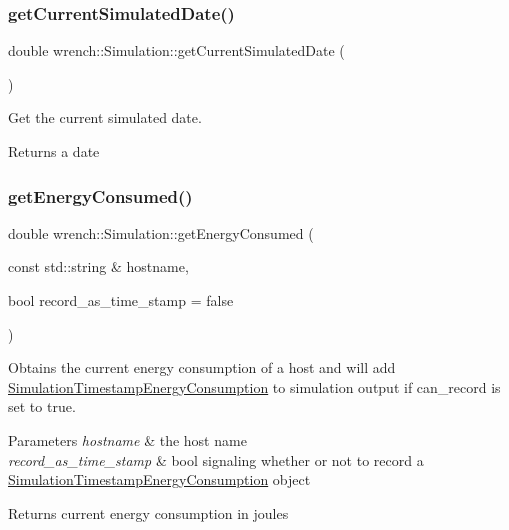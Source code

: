 \subsubsection{\texorpdfstring{get\+Current\+Simulated\+Date()}{getCurrentSimulatedDate()}}
{\footnotesize\ttfamily double wrench\+::\+Simulation\+::get\+Current\+Simulated\+Date (\begin{DoxyParamCaption}{ }\end{DoxyParamCaption})\hspace{0.3cm}{\ttfamily [static]}}



Get the current simulated date. 

\begin{DoxyReturn}{Returns}
a date 
\end{DoxyReturn}
\mbox{\label{classwrench_1_1_simulation_ad5096f3b1d622eab4494eca4ae828d73}} 
\subsubsection{\texorpdfstring{get\+Energy\+Consumed()}{getEnergyConsumed()}\hspace{0.1cm}{\footnotesize\ttfamily [1/2]}}
{\footnotesize\ttfamily double wrench\+::\+Simulation\+::get\+Energy\+Consumed (\begin{DoxyParamCaption}\item[{const std\+::string \&}]{hostname,  }\item[{bool}]{record\+\_\+as\+\_\+time\+\_\+stamp = {\ttfamily false} }\end{DoxyParamCaption})}



Obtains the current energy consumption of a host and will add \hyperlink{classwrench_1_1_simulation_timestamp_energy_consumption}{Simulation\+Timestamp\+Energy\+Consumption} to simulation output if can\+\_\+record is set to true. 


\begin{DoxyParams}{Parameters}
{\em hostname} & the host name \\
\hline
{\em record\+\_\+as\+\_\+time\+\_\+stamp} & bool signaling whether or not to record a \hyperlink{classwrench_1_1_simulation_timestamp_energy_consumption}{Simulation\+Timestamp\+Energy\+Consumption} object \\
\hline
\end{DoxyParams}
\begin{DoxyReturn}{Returns}
current energy consumption in joules 
\end{DoxyReturn}

